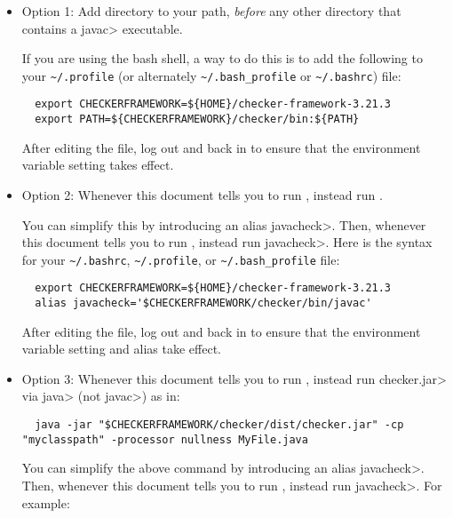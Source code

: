 \begin{itemize}
  \item
    Option 1:
    Add directory
     to your path, \emph{before} any other
    directory that contains a \<javac> executable.

    If you are
    using the bash shell, a way to do this is to add the following to your
    \verb|~/.profile| (or alternately \verb|~/.bash_profile| or \verb|~/.bashrc|) file:
\begin{Verbatim}
  export CHECKERFRAMEWORK=${HOME}/checker-framework-3.21.3
  export PATH=${CHECKERFRAMEWORK}/checker/bin:${PATH}
\end{Verbatim}

   After editing the file, log out and back in to ensure that the environment variable
   setting takes effect.

  \item
    \begin{sloppypar}
    Option 2:
    Whenever this document tells you to run ,
    instead run .
    \end{sloppypar}

    You can simplify this by introducing an alias \<javacheck>.  Then,
    whenever this document tells you to run , instead run
    \<javacheck>.  Here is the syntax for your
    \verb|~/.bashrc|, \verb|~/.profile|, or \verb|~/.bash_profile|
    file:
\begin{Verbatim}
  export CHECKERFRAMEWORK=${HOME}/checker-framework-3.21.3
  alias javacheck='$CHECKERFRAMEWORK/checker/bin/javac'
\end{Verbatim}

   After editing the file, log out and back in to ensure that the environment variable
   setting and alias take effect.

   \item
   Option 3:
   Whenever this document tells you to run , instead
   run \<checker.jar> via \<java> (not \<javac>) as in:

\begin{Verbatim}
  java -jar "$CHECKERFRAMEWORK/checker/dist/checker.jar" -cp "myclasspath" -processor nullness MyFile.java
\end{Verbatim}

    You can simplify the above command by introducing an alias
    \<javacheck>.  Then, whenever this document tells you to run
    , instead run \<javacheck>.  For example:


\end{itemize}
